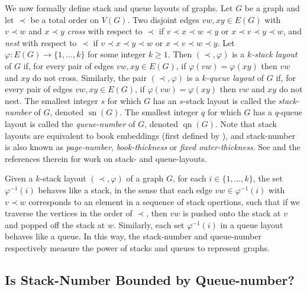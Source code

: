 \documentclass[kpfonts]{patmorin}
\DeclareMathOperator{\sn}{sn}
\DeclareMathOperator{\qn}{qn}
\renewcommand{\ge}{\geqslant}
\begin{document}
We now formally define stack and queue layouts of graphs.
Let $G$ be a graph and let $\prec$ be a total order on $V(G)$.  Two disjoint edges $vw,xy\in E(G)$ with $v\prec w$ and $x\prec y$ \emph{cross} with respect to $\prec$ if $v\prec x\prec w\prec y$ or $x\prec v\prec y\prec w$, and \emph{nest} with respect to $\prec$ if $v\prec x\prec y\prec w$ or $x\prec v\prec w\prec y$.
Let $\varphi:E(G)\to\{1,\ldots,k\}$ for some integer $k\ge 1$.  Then $(\prec,\varphi)$ is a \emph{$k$-stack layout} of $G$ if, for every pair of edges $vw,xy\in E(G)$, if $\varphi(vw) = \varphi(xy)$ then $vw$ and $xy$ do not cross. Similarly, the pair $(\prec,\varphi)$ is a \emph{$k$-queue layout} of $G$ if, for every pair of edges $vw,xy\in E(G)$, if $\varphi(vw)=\varphi(xy)$ then  $vw$ and $xy$ do not nest. The smallest integer $s$ for which $G$ has an $s$-stack layout is called the \emph{stack-number} of $G$, denoted  $\sn(G)$. The smallest integer $q$ for which $G$ has a $q$-queue layout is called the \emph{queue-number} of $G$, denoted $\qn(G)$. Note that stack layouts are equivalent to book embeddings (first defined by \citet{Ollmann73}), and stack-number is also known as \emph{page-number}, \emph{book-thickness} or \emph{fixed outer-thickness}. See \citep{BK79,DujWoo04,DujWoo-DCG07,DJMMUW20,DFP13,BFGMMRU19,Yannakakis89,Yann20,MBKPRU20} and the references therein for work on stack- and queue-layouts. 
 
Given a $k$-stack layout $(\prec,\varphi)$ of a graph $G$, for each $i\in\{1,\dots,k\}$, the set $\varphi^{-1}(i)$ behaves like a stack, in the sense that each edge $vw \in \varphi^{-1}(i)$ with $v\prec w$ corresponds to an element in a sequence of stack opertions, such that if we traverse the vertices in the order of $\prec$, then $vw$ is pushed onto the stack at $v$ and popped off the stack at $w$. Similarly, each set $\varphi^{-1}(i)$ in a queue layout  behaves like a queue. In this way, the stack-number and queue-number  respectively measure the power of stacks and queues to represent graphs.


\subsection*{Is Stack-Number Bounded by Queue-number?}
\end{document}

